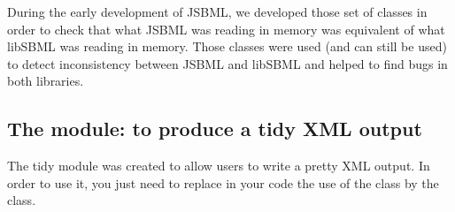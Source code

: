 During the early development of JSBML, we developed those set of classes in order to check that what
JSBML was reading in memory was equivalent of what libSBML was reading in memory. Those classes were
used (and can still be used) to detect inconsistency between JSBML and libSBML and helped to find bugs
 in both libraries.

\subsection{The  module: to produce a tidy XML output}

The tidy module was created to allow users to write a pretty XML output. In order to use it, you just need to replace
in your code the use of the \SBMLWriter{} class by the \TidySBMLWriter{} class.
